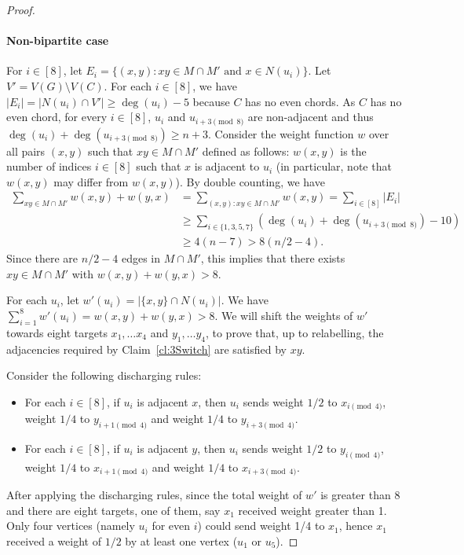 \documentclass[11pt,a4paper]{article}
\theoremstyle{definition}
\begin{document}
\begin{proof}
  \paragraph{Non-bipartite case}
  For $i \in [8]$, let
  $E_i = \{(x,y) \colon xy \in M\cap M' \text{ and } x \in N(u_i)\}$. Let
  $V' = V(G) \setminus V(C)$.  For each $i \in [8]$, we have
  $|E_i| = |N(u_i) \cap V'| \ge \deg(u_i) -5$ because $C$ has no even
  chords. As $C$ has no even chord, for every $i \in [8]$, $u_i$ and $u_{i+3\pmod 8}$ are non-adjacent and thus $\deg(u_i) + \deg(u_{i+3\pmod 8}) \ge n+3$. Consider the weight function $w$ over all pairs $(x,y)$ such that
  $xy \in M \cap M'$ defined as follows: $w(x,y)$ is the number of indices
  $i \in [8]$ such that $x$ is adjacent to $u_i$ (in particular, note that
  $w(x,y)$ may differ from $w(x,y)$). By double counting, we have
  \begin{align*}
    \sum_{xy \in M\cap M'} w(x,y) + w(y,x) & = \sum_{(x,y) : xy \in M\cap M'}w(x,y)
                                           = \sum_{i \in [8]} |E_i|\\
                                           &\ge \sum_{i \in \{1,3,5,7\}} (\deg(u_i) +\deg(u_{i+3\pmod 8}) - 10)\\
                                           &\ge 4(n-7) > 8(n/2-4).
  \end{align*}
  Since there are $n/2-4$ edges in $M\cap M'$, this implies that there exists
  $xy \in M\cap M'$ with $w(x,y) + w(y,x) > 8$.

  For each $u_i$, let $w'(u_i) = |\{x,y\} \cap N(u_i)|$. We have
  $\sum_{i=1}^8 w'(u_i)= w(x,y) +w(y,x) > 8$. We will shift the weights of $w'$
  towards eight targets $x_1, \dots x_4$ and $y_1, \dots y_4$, to prove that, up
  to relabelling, the adjacencies required by Claim~\ref{cl:3Switch} are satisfied by
  $xy$.

  Consider the following discharging rules:
  \begin{itemize}
  \item For each $i \in [8]$, if $u_i$ is adjacent $x$, then $u_i$ sends weight $1/2$ to
    $x_{i \pmod 4}$, weight $1/4$ to $y_{i+1\pmod 4}$ and weight $1/4$ to
    $y_{i+3\pmod 4}$.
  \item For each $i \in [8]$, if $u_i$ is adjacent $y$, then $u_i$ sends weight $1/2$ to
    $y_{i \pmod 4}$, weight $1/4$ to $x_{i+1\pmod 4}$ and weight $1/4$ to
    $x_{i+3\pmod 4}$.
  \end{itemize}
  After applying the discharging rules, since the total weight of $w'$ is
  greater than 8 and there are eight targets, one of them, say $x_1$ received
  weight greater than 1. Only four vertices (namely $u_i$ for even $i$) could send
  weight 1/4 to $x_1$, hence $x_1$ received a weight of $1/2$ by at least one
  vertex ($u_1$ or $u_5$).


\end{proof}
\end{document}
